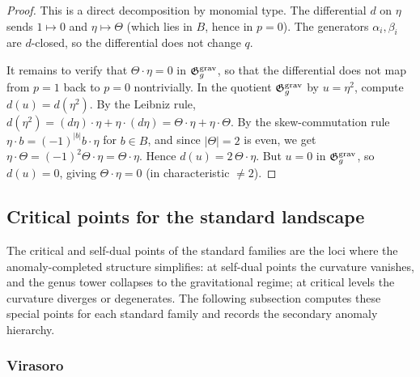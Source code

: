 \begin{proof}
This is a direct decomposition by monomial type.
The differential $d$ on $\eta$ sends $1 \mapsto 0$ and
$\eta \mapsto \Theta$ (which lies in $B$, hence in $p = 0$).
The generators $\alpha_i, \beta_i$ are $d$-closed, so the
differential does not change $q$.

It remains to verify that $\Theta \cdot \eta = 0$ in
$\mathfrak{G}_g^{\mathrm{grav}}$, so that the differential does not
map from $p = 1$ back to $p = 0$ nontrivially.
In the quotient $\mathfrak{G}_g^{\mathrm{grav}}$ by $u = \eta^2$,
compute $d(u) = d(\eta^2)$. By the Leibniz rule,
$d(\eta^2) = (d\eta) \cdot \eta + \eta \cdot (d\eta)
= \Theta \cdot \eta + \eta \cdot \Theta$.
By the skew-commutation rule
$\eta \cdot b = (-1)^{|b|} b \cdot \eta$ for $b \in B$,
and since $|\Theta| = 2$ is even, we get
$\eta \cdot \Theta = (-1)^{2} \Theta \cdot \eta
= \Theta \cdot \eta$.
Hence $d(u) = 2\,\Theta \cdot \eta$.
But $u = 0$ in $\mathfrak{G}_g^{\mathrm{grav}}$, so
$d(u) = 0$, giving $\Theta \cdot \eta = 0$
(in characteristic $\neq 2$).
\end{proof}

\subsection{Critical points for the standard landscape}


The critical and self-dual points of the standard families are
the loci where the anomaly-completed structure simplifies:
at self-dual points the curvature vanishes, and the genus tower
collapses to the gravitational regime; at critical levels
the curvature diverges or degenerates.
The following subsection computes these special points for each
standard family and records the secondary anomaly hierarchy.

\subsubsection{Virasoro}

